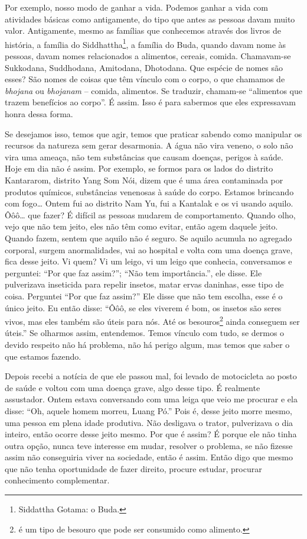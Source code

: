 Por exemplo, nosso modo de ganhar a vida. Podemos ganhar a vida com
atividades básicas como antigamente, do tipo que antes as pessoas davam
muito valor. Antigamente, mesmo as famílias que conhecemos através dos
livros de história, a família do Siddhattha\footnote{Siddattha Gotama:
o Buda.}, a família do Buda, quando davam nome às pessoas, davam nomes
relacionados a alimentos, cereais, comida. Chamavam-se Sukkodana,
Suddhodana, Amitodana, Dhotodana. Que espécie de nomes são esses? São
nomes de coisas que têm vínculo com o corpo, o que chamamos de
\textit{bhojana} ou \textit{bhojanam} – comida, alimentos. Se traduzir,
chamam-se “alimentos que trazem benefícios
ao corpo”. É assim. Isso é para sabermos que eles expressavam honra
dessa forma. 

Se desejamos isso, temos que agir, temos que praticar sabendo como
manipular os recursos da natureza sem gerar desarmonia. A água não vira
veneno, o solo não vira uma ameaça, não tem substâncias que causam
doenças, perigos à saúde. Hoje em dia não é assim. Por exemplo, se
formos para os lados do distrito Kantararom, distrito Yang Som Nói,
dizem que é uma área contaminada por produtos químicos, substâncias
venenosas à saúde do corpo. Estamos brincando com fogo… Ontem fui ao
distrito Nam Yu, fui a Kantalak e os vi usando aquilo. Ôôô… que fazer?
É difícil as pessoas mudarem de comportamento. Quando olho, vejo que
não tem jeito, eles não têm como evitar, então agem daquele jeito.
Quando fazem, sentem que aquilo não é seguro. Se aquilo acumula no
agregado corporal, surgem anormalidades, vai ao hospital e volta com
uma doença grave, fica desse jeito. Vi quem? Vi um leigo, vi um leigo
que conhecia, conversamos e perguntei: “Por que faz assim?”; “Não tem
importância.”, ele disse. Ele pulverizava inseticida para repelir
insetos, matar ervas daninhas, esse tipo de coisa. Perguntei “Por que
faz assim?” Ele disse que não tem escolha, esse é o único jeito. Eu
então disse: “Ôôô, se eles viverem é bom, os insetos são seres vivos,
mas eles também são úteis para nós. Até os
besouros\footnote{ é um
tipo de besouro que pode ser consumido como alimento.} ainda conseguem
ser úteis.” Se olharmos assim, entendemos. Temos vínculo com tudo, se
dermos o devido respeito não há problema, não há perigo algum, mas
temos que saber o que estamos fazendo. 

Depois recebi a notícia de que ele passou mal, foi levado de
motocicleta ao posto de saúde e voltou com uma doença grave, algo desse
tipo. É realmente assustador. Ontem estava conversando com uma leiga
que veio me procurar e ela disse: “Oh, aquele homem morreu, Luang Pó.”
Pois é, desse jeito morre mesmo, uma pessoa em plena idade produtiva.
Não desligava o trator, pulverizava o dia inteiro, então ocorre desse
jeito mesmo. Por que é assim? É porque ele não tinha outra opção, nunca
teve interesse em mudar, resolver o problema, se não fizesse assim não
conseguiria viver na sociedade, então é assim. Então digo que mesmo que
não tenha oportunidade de fazer direito, procure estudar, procurar
conhecimento complementar.

